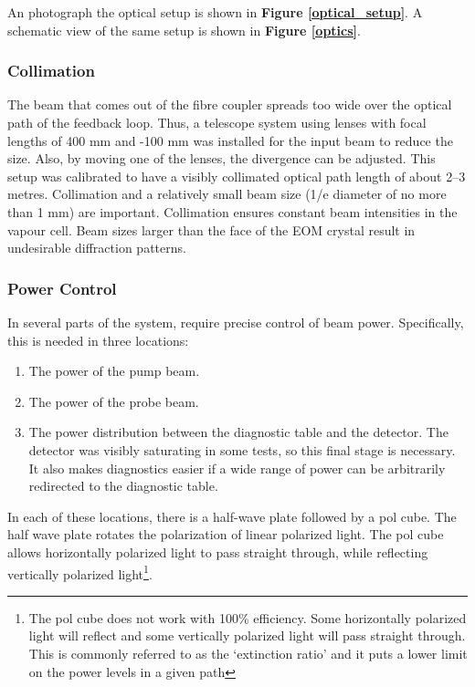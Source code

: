 An photograph the optical setup is shown in \textbf{Figure \ref{optical_setup}}.  A schematic view of the same setup is shown in \textbf{Figure \ref{optics}}.

    \subsubsection{Collimation}

The beam that comes out of the fibre coupler spreads too wide over the optical path of the feedback loop.  Thus, a telescope system using lenses with focal lengths of 400 mm and -100 mm was installed for the input beam to reduce the size. Also, by moving one of the lenses, the divergence can be adjusted. This setup was calibrated to have a visibly collimated optical path length of about 2--3 metres. Collimation and a relatively small beam size (1/e diameter of no more than 1 mm) are important. Collimation ensures constant beam intensities in the vapour cell. Beam sizes larger than the face of the EOM crystal result in undesirable diffraction patterns.

    \subsubsection{Power Control}

In several parts of the system, require precise control of beam power.  Specifically, this is needed in three locations: \\

\begin{enumerate}
    \item The power of the pump beam.
    \item The power of the probe beam.
    \item The power distribution between the diagnostic table and the detector.  The detector was visibly saturating in some tests, so this final stage is necessary.  It also makes diagnostics easier if a wide range of power can be arbitrarily redirected to the diagnostic table.
\end{enumerate}

In each of these locations, there is a half-wave plate followed by a pol cube.  The half wave plate rotates the polarization of linear polarized light.  The pol cube allows horizontally polarized light to pass straight through, while reflecting vertically polarized light\footnote{The pol cube does not work with 100\% efficiency. Some horizontally polarized light will reflect and some vertically polarized light will pass straight through. This is commonly referred to as the `extinction ratio' and it puts a lower limit on the power levels in a given path}.

